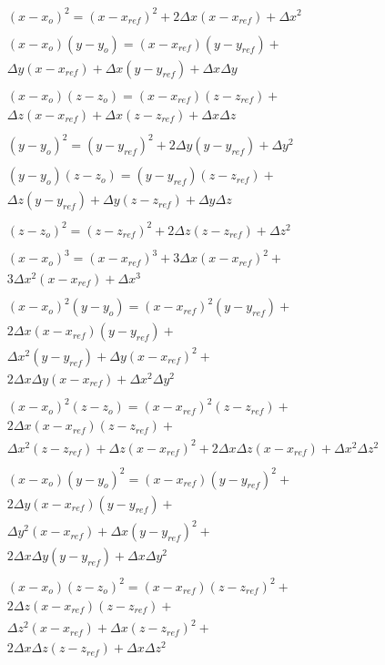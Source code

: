\begin{equation}
    \label{eq:a17}
    \begin{gathered}
    \nonumber
    (x-x_o)^2=(x-x_{ref})^2+2\Delta x(x-x_{ref})+\Delta x^2\\
    \\
    (x-x_o)(y-y_o)=(x-x_{ref})(y-y_{ref})+\\\Delta y(x-x_{ref})+\Delta x(y-y_{ref})+\Delta x\Delta y\\
    \\
    (x-x_o)(z-z_o)=(x-x_{ref})(z-z_{ref})+\\\Delta z(x-x_{ref})+\Delta x(z-z_{ref})+\Delta x\Delta z\\
    \\
    (y-y_o)^2=(y-y_{ref})^2+2\Delta y(y-y_{ref})+\Delta y^2\\
    \\
    (y-y_o)(z-z_o)=(y-y_{ref})(z-z_{ref})+\\\Delta z(y-y_{ref})+\Delta y(z-z_{ref})+\Delta y\Delta z\\
    \\
    (z-z_o)^2=(z-z_{ref})^2+2\Delta z(z-z_{ref})+\Delta z^2\\
    \\
    (x-x_o)^3=(x-x_{ref})^3+3\Delta x(x-x_{ref})^2+\\3\Delta x^2(x-x_{ref})+\Delta x^3\\
    \\
    (x-x_o)^2(y-y_o)=(x-x_{ref})^2(y-y_{ref})+\\2\Delta x(x-x_{ref})(y-y_{ref})+\\
    \Delta x^2(y-y_{ref})+\Delta y(x-x_{ref})^2+\\2\Delta x\Delta y(x-x_{ref})+\Delta x^2\Delta y^2\\
    \\
    (x-x_o)^2(z-z_o)=(x-x_{ref})^2(z-z_{ref})+\\2\Delta x(x-x_{ref})(z-z_{ref})+\\
    \Delta x^2(z-z_{ref})+\Delta z(x-x_{ref})^2+2\Delta x\Delta z(x-x_{ref})+\Delta x^2\Delta z^2\\
    \\
    (x-x_o)(y-y_o)^2=(x-x_{ref})(y-y_{ref})^2+\\2\Delta y(x-x_{ref})(y-y_{ref})+\\
    \Delta y^2 (x-x_{ref})+\Delta x (y-y_{ref})^2+\\2\Delta x\Delta y(y-y_{ref})+\Delta x \Delta y^2\\
    \\
    (x-x_o)(z-z_o)^2=(x-x_{ref})(z-z_{ref})^2+\\2\Delta z(x-x_{ref})(z-z_{ref})+\\
    \Delta z^2 (x-x_{ref})+\Delta x (z-z_{ref})^2+\\2\Delta x\Delta z(z-z_{ref})+\Delta x \Delta z^2\\
    \\
     \end{gathered}
\end{equation}\\
